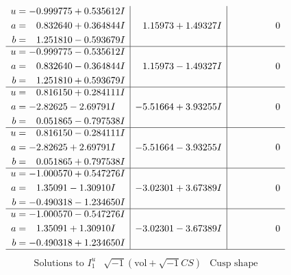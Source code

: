 \documentclass[1p]{elsarticle_modified}
\theoremstyle{definition}
\newcommand{\I}{\sqrt{-1}}
\begin{document}
$$\begin{array}{c|c|c}
\begin{aligned}
u &= -0.999775 + 0.535612 I \\
a &= \phantom{-}0.832640 + 0.364844 I \\
b &= \phantom{-}1.251810 - 0.593679 I\end{aligned}
 & \phantom{-}1.15973 + 1.49327 I & \phantom{-0.000000 } 0 \\ \hline\begin{aligned}
u &= -0.999775 - 0.535612 I \\
a &= \phantom{-}0.832640 - 0.364844 I \\
b &= \phantom{-}1.251810 + 0.593679 I\end{aligned}
 & \phantom{-}1.15973 - 1.49327 I & \phantom{-0.000000 } 0 \\ \hline\begin{aligned}
u &= \phantom{-}0.816150 + 0.284111 I \\
a &= -2.82625 - 2.69791 I \\
b &= \phantom{-}0.051865 - 0.797538 I\end{aligned}
 & -5.51664 + 3.93255 I & \phantom{-0.000000 } 0 \\ \hline\begin{aligned}
u &= \phantom{-}0.816150 - 0.284111 I \\
a &= -2.82625 + 2.69791 I \\
b &= \phantom{-}0.051865 + 0.797538 I\end{aligned}
 & -5.51664 - 3.93255 I & \phantom{-0.000000 } 0 \\ \hline\begin{aligned}
u &= -1.000570 + 0.547276 I \\
a &= \phantom{-}1.35091 - 1.30910 I \\
b &= -0.490318 - 1.234650 I\end{aligned}
 & -3.02301 + 3.67389 I & \phantom{-0.000000 } 0 \\ \hline\begin{aligned}
u &= -1.000570 - 0.547276 I \\
a &= \phantom{-}1.35091 + 1.30910 I \\
b &= -0.490318 + 1.234650 I\end{aligned}
 & -3.02301 - 3.67389 I & \phantom{-0.000000 } 0\\
 \hline 
 \end{array}$$\newpage$$\begin{array}{c|c|c}  
\text{Solutions to }I^u_{1}& \I (\text{vol} + \sqrt{-1}CS) & \text{Cusp shape}\\
 \hline 
\begin{aligned}

\end{aligned}
\end{array}$$
\end{document}

